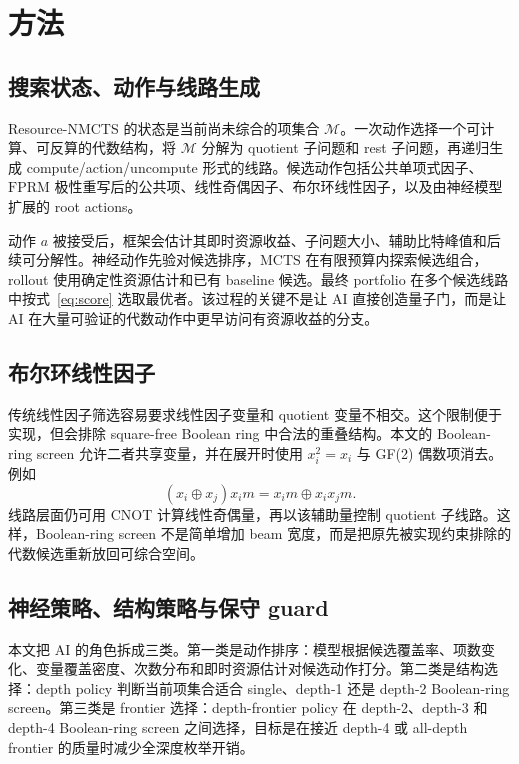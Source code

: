 \documentclass[UTF8,fontset=macnew,11pt]{ctexart}
\newcommand{\method}{Resource-NMCTS}
\newcommand{\screen}{Boolean-ring screen}
\newcommand{\fprm}{\ensuremath{\mathrm{FPRM}}}
\newcommand{\mcts}{\ensuremath{\mathrm{MCTS}}}
\newcommand{\xor}{\ensuremath{\oplus}}
\begin{document}
\section{方法}

\subsection{搜索状态、动作与线路生成}

\method{} 的状态是当前尚未综合的项集合 $\mathcal{M}$。一次动作选择一个可计算、可反算的代数结构，将 $\mathcal{M}$ 分解为 quotient 子问题和 rest 子问题，再递归生成 compute/action/uncompute 形式的线路。候选动作包括公共单项式因子、\fprm{} 极性重写后的公共项、线性奇偶因子、布尔环线性因子，以及由神经模型扩展的 root actions。

动作 $a$ 被接受后，框架会估计其即时资源收益、子问题大小、辅助比特峰值和后续可分解性。神经动作先验对候选排序，\mcts{} 在有限预算内探索候选组合，rollout 使用确定性资源估计和已有 baseline 候选。最终 portfolio 在多个候选线路中按式~\eqref{eq:score} 选取最优者。该过程的关键不是让 AI 直接创造量子门，而是让 AI 在大量可验证的代数动作中更早访问有资源收益的分支。

\subsection{布尔环线性因子}

传统线性因子筛选容易要求线性因子变量和 quotient 变量不相交。这个限制便于实现，但会排除 square-free Boolean ring 中合法的重叠结构。本文的 \screen{} 允许二者共享变量，并在展开时使用 $x_i^2=x_i$ 与 GF(2) 偶数项消去。例如
\begin{equation}
  (x_i\xor x_j)x_i m = x_i m \xor x_i x_j m .
  \label{eq:boolean-ring}
\end{equation}
线路层面仍可用 CNOT 计算线性奇偶量，再以该辅助量控制 quotient 子线路。这样，\screen{} 不是简单增加 beam 宽度，而是把原先被实现约束排除的代数候选重新放回可综合空间。

\subsection{神经策略、结构策略与保守 guard}

本文把 AI 的角色拆成三类。第一类是动作排序：模型根据候选覆盖率、项数变化、变量覆盖密度、次数分布和即时资源估计对候选动作打分。第二类是结构选择：depth policy 判断当前项集合适合 single、depth-1 还是 depth-2 \screen{}。第三类是 frontier 选择：depth-frontier policy 在 depth-2、depth-3 和 depth-4 \screen{} 之间选择，目标是在接近 depth-4 或 all-depth frontier 的质量时减少全深度枚举开销。
\end{document}
